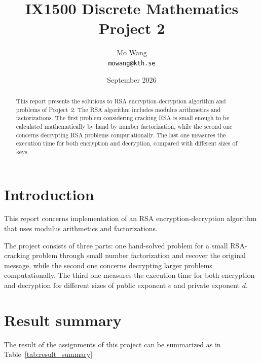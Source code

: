 \documentclass[11pt,a4paper]{article}
\title{
    \textbf{IX1500 Discrete Mathematics}\\
    Project 2
}
\author{
    Mo Wang\\
    \texttt{mowang@kth.se}
}
\date{September 2026}
\begin{document}
\maketitle

\begin{abstract}

This report presents the solutions to RSA encryption-decryption algorithm and problems of Project~2. The RSA algorithm includes modulus arithmetics and factorizations. The first problem considering cracking RSA is small enough to be calculated mathematically by hand by number factorization, while the second one concerns decrypting RSA problems computationally. The last one measures the execution time for both encryption and decryption, compared with different sizes of keys.

\end{abstract}

\section*{Introduction}

This report concerns implementation of an RSA encryption-decryption algorithm that uses modulus arithmetics and factorizations. 

The project consists of three parts: one hand-solved problem for a small RSA-cracking problem through small number factorization and recover the original message, while the second one concerns decrypting larger problems computationally. The third one measures the execution time for both encryption and decryption for different sizes of public exponent $e$ and private exponent $d$.

\section*{Result summary}

The result of the assignments of this project can be summarized as in Table~\ref{tab:result_summary}
\end{document}
